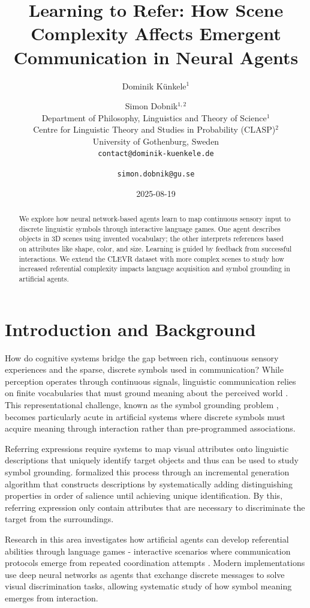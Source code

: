\documentclass[11pt,a4paper]{article}
\title{Learning to Refer: How Scene Complexity Affects Emergent Communication in Neural Agents}
\author{Dominik Künkele$^{1}$ \and Simon Dobnik$^{1,2}$ \\
        Department of Philosophy, Linguistics and Theory of Science$^{1}$ \\ 
        Centre for Linguistic Theory and Studies in Probability (CLASP)$^{2}$ \\
        University of Gothenburg, Sweden \\
        \texttt{contact@dominik-kuenkele.de} \and \texttt{simon.dobnik@gu.se}}
\date{2025-08-19}
\begin{document}
\maketitle
\begin{abstract}
  We explore how neural network-based agents learn to map continuous sensory input to discrete linguistic symbols through interactive language games.
  One agent describes objects in 3D scenes using invented vocabulary; the other interprets references based on attributes like shape, color, and size.
  Learning is guided by feedback from successful interactions.
  We extend the CLEVR dataset with more complex scenes to study how increased referential complexity impacts language acquisition and symbol grounding in artificial agents.
\end{abstract}

\section{Introduction and Background}
How do cognitive systems bridge the gap between rich, continuous sensory experiences and the sparse, discrete symbols used in communication?
While perception operates through continuous signals, linguistic communication relies on finite vocabularies that must ground meaning about the perceived world \citep{Regier1996,Roy2005,Cooper2023}.
This representational challenge, known as the symbol grounding problem \citep{Harnad1990}, becomes particularly acute in artificial systems where discrete symbols must acquire meaning through interaction rather than pre-programmed associations.

Referring expressions require systems to map visual attributes onto linguistic descriptions that uniquely identify target objects and thus can be used to study symbol grounding.
\citet{Dale1995} formalized this process through an incremental generation algorithm that constructs descriptions by systematically adding distinguishing properties in order of salience until achieving unique identification.
By this, referring expression only contain attributes that are necessary to discriminate the target from the surroundings.

Research in this area investigates how artificial agents can develop referential abilities through language games - interactive scenarios where communication protocols emerge from repeated coordination attempts \citep{Clark1996,Bartlett2005,Kirby2008,Steels2009,Kharitonov2019,Lazaridou2017}.
Modern implementations use deep neural networks as agents that exchange discrete messages to solve visual discrimination tasks, allowing systematic study of how symbol meaning emerges from interaction.
\end{document}
